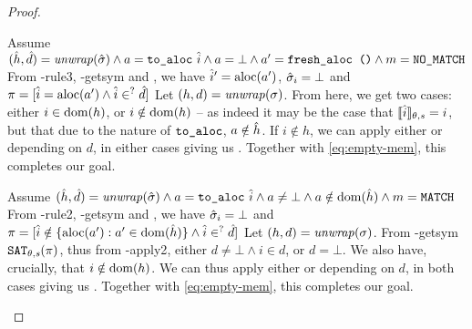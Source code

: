 \begin{proof}

\begin{hypvlist}
 Assume $(\hat{h},\hat{d})={\operatorname{\mathit{unwrap}}}(\hat{\sigma}) \land a = \texttt{to\_aloc}~\hat{i} \land a = \bot \land a'=\texttt{fresh\_aloc ()} \land m=\texttt{NO\_MATCH}$
 From \hyp{rule3}, \hyp{getsym} and , we have $\hat{i}'=\text{aloc}(a')$, $\hat{\sigma}_i=\bot$ and $\\{\pi=[\hat{i}=\text{aloc}(a')\land \hat{i}\in^?\hat{d}]}$
 Let $(h,d)={\operatorname{\mathit{unwrap}}}(\sigma)$.%
 From here, we get two cases: either $i\in \operatorname{dom}(h)$, or $i\notin \operatorname{dom}(h)$ -- as indeed it may be the case that $\llbracket\hat{i}\rrbracket_{\theta,s}=i$, but that due to the nature of $\texttt{to\_aloc}$, $a\notin \hat{h}$.
 If $i\notin h$, we can apply either  or  depending on $d$, in either cases giving us . Together with \ref{eq:empty-mem}, this completes our goal.
\end{hypvlist}


\begin{hypvlist}
 Assume $(\hat{h},\hat{d})={\operatorname{\mathit{unwrap}}}(\hat{\sigma}) \land a = \texttt{to\_aloc}~\hat{i} \land a \neq \bot \land a\notin\operatorname{dom}(\hat{h}) \land m=\texttt{MATCH}$
 From \hyp{rule2}, \hyp{getsym} and , we have $\hat{\sigma}_i=\bot$ and $\\{\pi=[\hat{i} \notin \{\text{aloc}(a'):a'\in \operatorname{dom}(\hat{h})\} \land \hat{i} \in^? \hat{d}]}$%
 Let $(h,d)={\operatorname{\mathit{unwrap}}}(\sigma)$.
 From \hyp{getsym} $\texttt{SAT}_{\mathit{\theta,s}}(\pi)$, thus from \hyp{apply2}, either $d\neq\bot\land i\in d$, or $d=\bot$. We also have, crucially, that $i\notin \operatorname{dom}(h)$.
 We can thus apply either  or  depending on $d$, in both cases giving us . Together with \ref{eq:empty-mem}, this completes our goal.
\end{hypvlist}



\end{proof}
